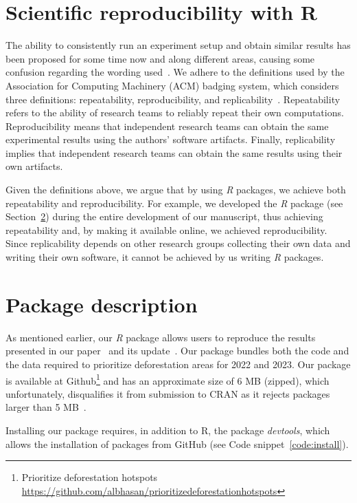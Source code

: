 \documentclass[12pt]{article}
\begin{document}
\section{Scientific reproducibility with \textsf{R}}

The ability to consistently run an experiment setup and obtain similar results has been proposed for some time now and along different areas, causing some confusion regarding the wording used~\cite{plesser2018}.
We adhere to the definitions used by the Association for Computing Machinery (ACM) badging system, which considers three definitions: repeatability, reproducibility, and replicability~\cite{acm2020}.
Repeatability refers to the ability of research teams to reliably repeat their own computations. 
Reproducibility means that independent research teams can obtain the same experimental results using the authors' software artifacts. 
Finally, replicability implies that independent research teams can obtain the same results using their own artifacts.

Given the definitions above, we argue that by using \textit{R} packages, we achieve both repeatability and reproducibility.
For example, we developed the \textit{R} package (see Section~\ref{sec:package}) during the entire development of our manuscript, thus achieving repeatability and, by making it available online, we achieved reproducibility.
Since replicability depends on other research groups collecting their own data and writing their own software, it cannot be achieved by us writing  \textit{R} packages.

\section{Package description}
\label{sec:package}

As mentioned earlier, our \textit{R} package allows users to reproduce the results presented in our paper~\cite{mataveli2022} and its update~\cite{mataveli2023}. 
Our package bundles both the code and the data required to prioritize deforestation areas for 2022 and 2023.
Our package is available at Github\footnote{Prioritize deforestation hotspots \url{https://github.com/albhasan/prioritizedeforestationhotspots}} and has an approximate size of 6 MB (zipped), which unfortunately, disqualifies it from submission to CRAN as it rejects packages larger than 5 MB~\cite{cranpolicy}.

Installing our package requires, in addition to \textsf{R}, the package \textit{devtools}, which allows the installation of packages from GitHub (see Code snippet~\ref{code:install}).
\end{document}
